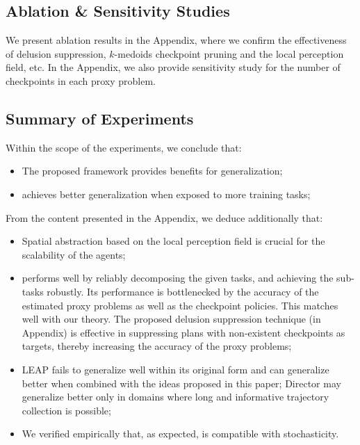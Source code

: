 \subsection{Ablation \& Sensitivity Studies}
We present ablation results in the Appendix, where we confirm the effectiveness of delusion suppression, $k$-medoids checkpoint pruning and the local perception field, etc. In the Appendix, we also provide sensitivity study for the number of checkpoints in each proxy problem.

\subsection{Summary of Experiments}
Within the scope of the experiments, we conclude that:
\begin{itemize}[leftmargin=*]
\item{} The proposed \agentshort{} framework provides benefits for generalization;
\item{} \agentshort{} achieves better generalization when exposed to more training tasks;
\end{itemize}

From the content presented in the Appendix, we deduce additionally that: 
\begin{itemize}[leftmargin=*]
\item{} Spatial abstraction based on the local perception field  is crucial for the scalability of the agents;
\item{} \agentshort{} performs well by reliably decomposing the given tasks, and achieving the sub-tasks robustly. Its performance is bottlenecked by the accuracy of the estimated proxy problems as well as the checkpoint policies. This matches well with our theory. The proposed delusion suppression technique (in Appendix) is effective in suppressing plans with non-existent checkpoints as targets, thereby increasing the accuracy of the proxy problems;
\item{} LEAP fails to generalize well within its original form and can generalize better when combined with the ideas proposed in this paper; Director may generalize better only in domains where long and informative trajectory collection is possible;

\item{} We verified empirically that, as expected, \agentshort{} is compatible with stochasticity.
\end{itemize}

\vspace*{-2mm}
